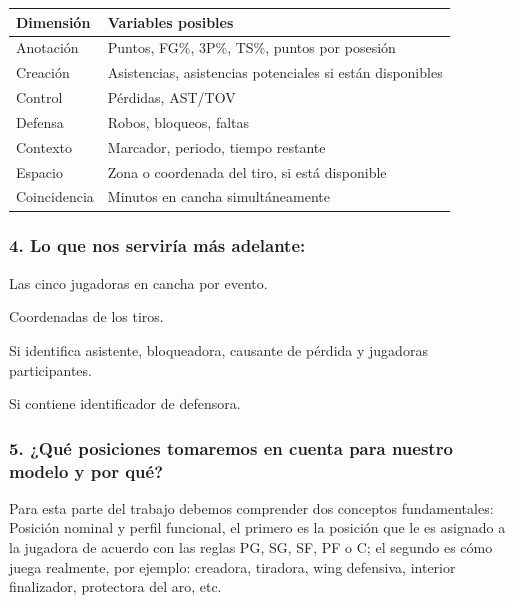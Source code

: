 \begin{longtable}{@{}p{3cm}p{9.5cm}@{}}
\toprule\textbf{Dimensión}&\textbf{Variables posibles}\\\midrule\endhead
Anotación&Puntos, FG\%, 3P\%, TS\%, puntos por posesión\\
Creación&Asistencias, asistencias potenciales si están disponibles\\
Control&Pérdidas, AST/TOV\\
Defensa&Robos, bloqueos, faltas\\
Contexto&Marcador, periodo, tiempo restante\\
Espacio&Zona o coordenada del tiro, si está disponible\\
Coincidencia&Minutos en cancha simultáneamente\\
\bottomrule
\end{longtable}

\subsubsection*{4. Lo que nos serviría más adelante:}
Las cinco jugadoras en cancha por evento.

Coordenadas de los tiros.

Si identifica asistente, bloqueadora, causante de pérdida y jugadoras participantes.

Si contiene identificador de defensora.

\subsubsection*{5. ¿Qué posiciones tomaremos en cuenta para nuestro modelo y por qué?}
Para esta parte del trabajo debemos comprender dos conceptos fundamentales: Posición nominal y perfil funcional, el primero es la posición que le es asignado a la jugadora de acuerdo con las reglas PG, SG, SF, PF o C; el segundo es cómo juega realmente, por ejemplo: creadora, tiradora, wing defensiva, interior finalizador, protectora del aro, etc.


